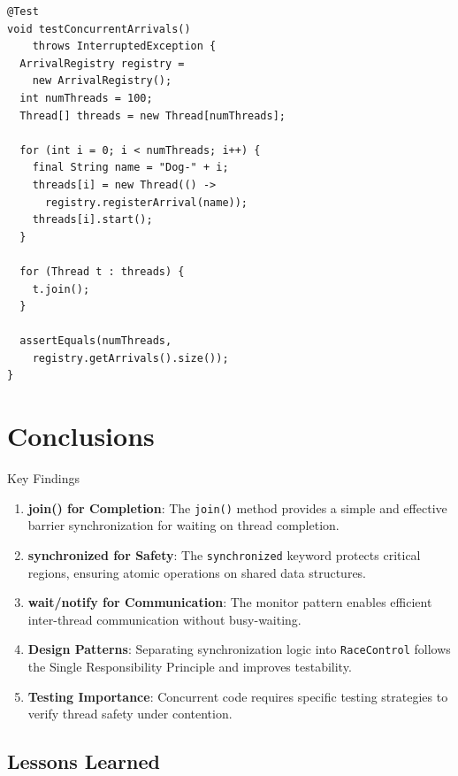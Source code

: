 \documentclass[10pt,a4paper,twocolumn]{article}
\begin{document}
\begin{lstlisting}[caption={Concurrent Test Example}]
@Test
void testConcurrentArrivals() 
    throws InterruptedException {
  ArrivalRegistry registry = 
    new ArrivalRegistry();
  int numThreads = 100;
  Thread[] threads = new Thread[numThreads];
  
  for (int i = 0; i < numThreads; i++) {
    final String name = "Dog-" + i;
    threads[i] = new Thread(() -> 
      registry.registerArrival(name));
    threads[i].start();
  }
  
  for (Thread t : threads) {
    t.join();
  }
  
  assertEquals(numThreads, 
    registry.getArrivals().size());
}
\end{lstlisting}

\section{Conclusions}

\begin{resultbox}{Key Findings}
\begin{enumerate}
    \item \textbf{join() for Completion}: The \texttt{join()} method provides a simple and effective barrier synchronization for waiting on thread completion.
    
    \item \textbf{synchronized for Safety}: The \texttt{synchronized} keyword protects critical regions, ensuring atomic operations on shared data structures.
    
    \item \textbf{wait/notify for Communication}: The monitor pattern enables efficient inter-thread communication without busy-waiting.
    
    \item \textbf{Design Patterns}: Separating synchronization logic into \texttt{RaceControl} follows the Single Responsibility Principle and improves testability.
    
    \item \textbf{Testing Importance}: Concurrent code requires specific testing strategies to verify thread safety under contention.
\end{enumerate}
\end{resultbox}

\subsection{Lessons Learned}
\end{document}
